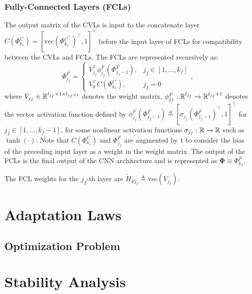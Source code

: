 \documentclass[letterpaper, journal]{IEEEtran}
\newcommand{\matPhi}{\mathbf{\Phi}}
\newcommand{\phiF}{\phi_{j_f}^{F}}
\newcommand{\tH}{\tilde{H}}
\begin{document}
\subsubsection{Fully-Connected Layers (FCLs)}
The output matrix of the CVLs is input to the concatenate layer
$C(\Phi_{k_c}^{C}) = [\text{vec}(\Phi_{k_c}^{C^{\top}})^{\top}, 1]^{\top}$
before the input layer of FCLs for compatibility between the CVLs and FCLs.
The FCLs are represented recursively as:
\begin{equation} \label{eq:fcl_output}
  \Phi_{j_f}^{F} 
  = 
  \begin{cases} 
    V_{j_f}^{\top}\phiF(\Phi_{j_f-1}^{F}), & j_f \in [1,\dots,k_f] 
    \\ 
    V_{0}^{\top}C(\Phi_{k_c}^{C}), 
    & 
    j_f = 0 
  \end{cases}
  ,
\end{equation}
where 
$V_{j_f} \in \mathbb{R}^{l_{j_f}+1 \times l_{j_f+1}}$ denotes the weight matrix, 
$\phiF: \R^{l_{j_f}} \to \R^{l_{j_f}+1}$ denotes the vector activation function defined by $\phiF(\Phi_{j_f-1}^{F}) \triangleq [\sigma_{j_f}(\Phi_{j_f-1}^{F})^\top, 1]^\top$ for $j_f \in [1,\dots,k_f-1]$, for some nonlinear activation functions $\sigma_{j_f}: \mathbb{R} \to \mathbb{R}$ such as $\tanh(\cdot)$. 
Note that $C(\Phi_{k_c}^{C})$ and $\Phi_{j_f}^{F}$ are augmented by $1$ to consider the bias of the preceding input layer as a weight in the weight matrix. The output of the FCLs is the final output of the CNN architecture and is represented as $\matPhi \equiv \Phi_{k_f}^{F}$.

The FCL weights for the $j_f$-th layer are $\tH_{Fj_f} \triangleq \text{vec}(V_{j_f})$.

\section{Adaptation Laws}
\subsection{Optimization Problem}

\section{Stability Analysis}
\end{document}

